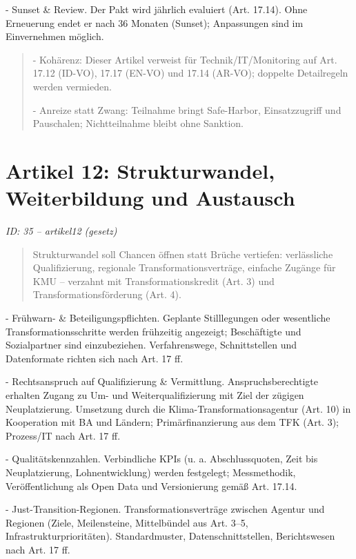 \documentclass[12pt,a4paper]{scrartcl}
\begin{document}
- Sunset \& Review. Der Pakt wird jährlich evaluiert (Art. 17.14). Ohne Erneuerung endet er nach 36 Monaten (Sunset); Anpassungen sind im Einvernehmen möglich.

{\footnotesize\begin{quote}
- Kohärenz: Dieser Artikel verweist für Technik/IT/Monitoring auf Art. 17.12 (ID-VO), 17.17 (EN-VO) und 17.14 (AR-VO); doppelte Detailregeln werden vermieden.

- Anreize statt Zwang: Teilnahme bringt Safe-Harbor, Einsatzzugriff und Pauschalen; Nichtteilnahme bleibt ohne Sanktion.
\end{quote}}



\section[Artikel 12: Strukturwandel, Weiterbildung und Austausch]{Artikel 12: Strukturwandel, Weiterbildung und Austausch}
\noindent\textit{ID: 35 -- artikel12 (gesetz)}

\begin{quote}
Strukturwandel soll Chancen öffnen statt Brüche vertiefen: verlässliche Qualifizierung, regionale Transformationsverträge, einfache Zugänge für KMU -- verzahnt mit Transformationskredit (Art. 3) und Transformationsförderung (Art. 4).
\end{quote}

- Frühwarn- \& Beteiligungspflichten. Geplante Stilllegungen oder wesentliche Transformationsschritte werden frühzeitig angezeigt; Beschäftigte und Sozialpartner sind einzubeziehen. Verfahrenswege, Schnittstellen und Datenformate richten sich nach Art. 17 ff.

- Rechtsanspruch auf Qualifizierung \& Vermittlung. Anspruchsberechtigte erhalten Zugang zu Um- und Weiterqualifizierung mit Ziel der zügigen Neuplatzierung. Umsetzung durch die Klima-Transformationsagentur (Art. 10) in Kooperation mit BA und Ländern; Primärfinanzierung aus dem TFK (Art. 3); Prozess/IT nach Art. 17 ff.

- Qualitätskennzahlen. Verbindliche KPIs (u. a. Abschlussquoten, Zeit bis Neuplatzierung, Lohnentwicklung) werden festgelegt; Messmethodik, Veröffentlichung als Open Data und Versionierung gemäß Art. 17.14.

- Just-Transition-Regionen. Transformationsverträge zwischen Agentur und Regionen (Ziele, Meilensteine, Mittelbündel aus Art. 3--5, Infrastrukturprioritäten). Standardmuster, Datenschnittstellen, Berichtswesen nach Art. 17 ff.
\end{document}
